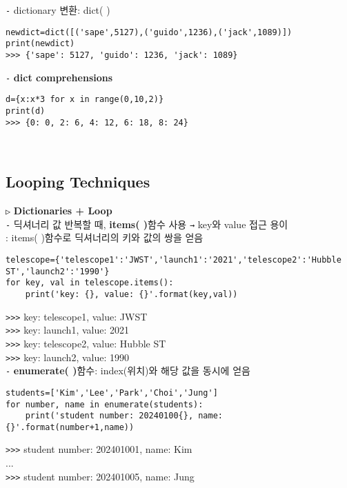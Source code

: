 \documentclass[11pt,a4paper]{article}
\begin{document}
\texttt{-} dictionary 변환: dict( )
\begin{lstlisting}[label={list:first}]
newdict=dict([('sape',5127),('guido',1236),('jack',1089)])
print(newdict)
>>> {'sape': 5127, 'guido': 1236, 'jack': 1089}
\end{lstlisting}

\texttt{-} \textbf{dict comprehensions}
\begin{lstlisting}[label={list:first}]
d={x:x*3 for x in range(0,10,2)}
print(d)
>>> {0: 0, 2: 6, 4: 12, 6: 18, 8: 24}
\end{lstlisting}\\

\subsection{\Large\textbf{Looping Techniques}}
\begin{spacing}{1.5}
\texttt{▷} \textbf{Dictionaries + Loop}\\
\texttt{-} 딕셔너리 값 반복할 때, \textbf{items( )}함수 사용 \texttt{→} key와 value 접근 용이\\
\hspace*{2em}: items( )함수로 딕셔너리의 키와 값의 쌍을 얻음
\end{spacing}
\begin{lstlisting}[label={list:first}]
telescope={'telescope1':'JWST','launch1':'2021','telescope2':'Hubble ST','launch2':'1990'}
for key, val in telescope.items():
    print('key: {}, value: {}'.format(key,val))
\end{lstlisting}
\verb|>>>| key: telescope1, value: JWST\\
\verb|>>>| key: launch1, value: 2021\\
\verb|>>>| key: telescope2, value: Hubble ST\\
\verb|>>>| key: launch2, value: 1990\\

\texttt{-} \textbf{enumerate( )}함수: index(위치)와 해당 값을 동시에 얻음
\begin{lstlisting}[label={list:first}]
students=['Kim','Lee','Park','Choi','Jung']
for number, name in enumerate(students):
    print('student number: 20240100{}, name: {}'.format(number+1,name))
\end{lstlisting}
\verb|>>>| student number: 202401001, name: Kim\\
...\\
\verb|>>>| student number: 202401005, name: Jung\\
\end{document}
